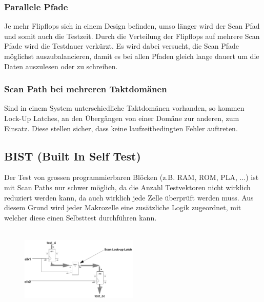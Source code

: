 \subsubsection{Parallele Pfade}
Je mehr Flipflops sich in einem Design befinden, umso länger wird der Scan Pfad und somit auch die Testzeit. Durch die Verteilung der Flipflops auf mehrere Scan Pfade wird die Testdauer verkürzt. Es wird dabei versucht, die Scan Pfade möglichst auszubalancieren, damit es bei allen Pfaden gleich lange dauert um die Daten auszulesen oder zu schreiben.

\begin{multicols}{2}
    \subsubsection{Scan Path bei mehreren Taktdomänen}
    Sind in einem System unterschiedliche Taktdomänen vorhanden, so kommen Lock-Up Latches, an den Übergängen von einer Domäne zur anderen, zum Einsatz. Diese stellen sicher, dass keine laufzeitbedingten Fehler auftreten.

    \subsection{BIST (Built In Self Test)}
    Der Test von grossen programmierbaren Blöcken (z.B. RAM, ROM, PLA, ...) ist mit Scan Paths nur schwer möglich, da die Anzahl Testvektoren nicht wirklich reduziert werden kann, da auch wirklich jede Zelle überprüft werden muss. Aus diesem Grund wird jeder Makrozelle eine zusätzliche Logik zugeordnet, mit welcher diese einen Selbsttest durchführen kann. \ \\ \ \\
    \begin{figure}[H]
        \includegraphics[width=0.5\textwidth]{images/scanpath_lookuplatch.png}
    \end{figure}
\end{multicols}

